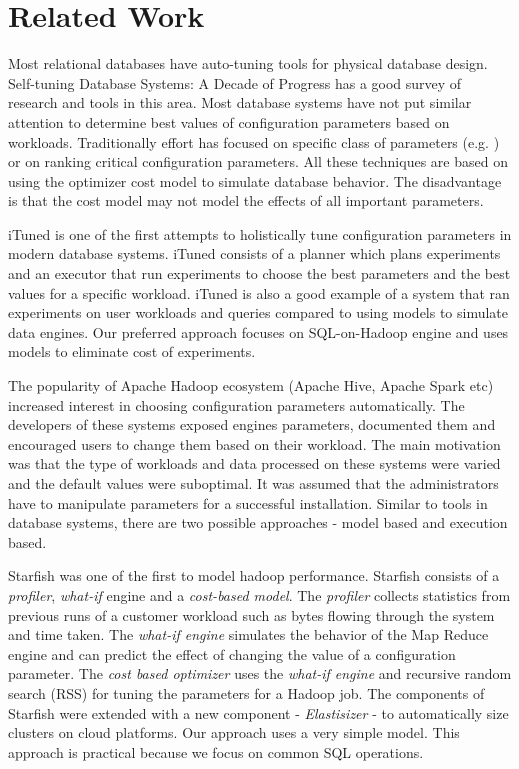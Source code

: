 \section{Related Work}
\label{sec:relatedwork}
Most relational databases have auto-tuning tools for physical database design. 
Self-tuning Database Systems: A Decade of Progress\cite{Chaudhuri:2007:SDS:1325851.1325856}
 has a good survey of research and tools in this area. Most database systems have 
not put similar attention to determine best values of configuration parameters 
based on workloads. Traditionally effort has focused on specific class of parameters 
(e.g.\cite{Storm:2006:ASM:1182635.1164220} ) or on ranking
critical configuration parameters\cite{DBLP:conf/icde/DebnathLM08}. All these techniques
are based on using the optimizer cost model to simulate database behavior. The disadvantage is
that the cost model may not model the effects of all important parameters.

iTuned\cite{Duan:2009:TDC:1687627.1687767} is one of the first attempts to holistically 
tune configuration parameters in modern database systems. iTuned consists of a planner
which plans experiments and an executor that run experiments to choose the best parameters
and the best values for a specific workload. iTuned is also a good example of a system that
ran experiments on user workloads and queries compared to using models to simulate data engines.
Our preferred approach focuses on SQL-on-Hadoop engine and uses models to eliminate cost of experiments.
 
The popularity of Apache Hadoop ecosystem (Apache Hive, Apache Spark etc) increased interest
in choosing configuration parameters automatically. The developers of these systems exposed
engines parameters, documented them and encouraged users to change them based on their workload.
The main motivation was that the type of workloads and data processed on these systems were varied
and the default values were suboptimal. It was assumed that the administrators have to manipulate
parameters for a successful installation. Similar to tools in database systems, there are two possible approaches - model based and execution based.

Starfish\cite{herodotou2011starfish} was one of the first to model hadoop performance. Starfish 
consists of a \textit{profiler}, \textit{what-if} engine and a \textit{cost-based model}\cite{herodotou2011profiling}. 
The \textit{profiler} collects statistics from previous runs of a customer workload 
such as bytes flowing through the system and time taken. The \textit{what-if engine} simulates 
the behavior of the Map Reduce engine and can predict the effect of changing the value 
of a configuration parameter. The \textit{cost based optimizer} uses the \textit{what-if engine}
and recursive random search (RSS) for tuning the parameters for a Hadoop job. The components of
Starfish were extended with a new component - \textit{Elastisizer}\cite{Herodotou:2011:NOS:2038916.2038934}
- to automatically size clusters on cloud platforms. Our approach uses a very simple model. This approach
is practical because we focus on common SQL operations. 

